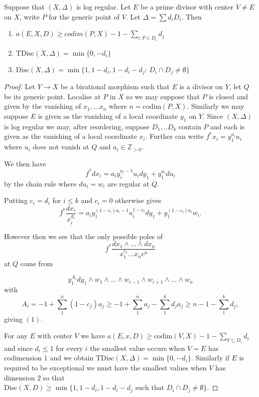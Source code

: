 \begin{lemma}
	Suppose that $(X,\Delta)$ is log regular. Let $E$ be a prime divisor with center $V\neq E$ on $X$, write $P$ for the generic point of $V$. Let $\Delta= \sum d_{i}D_{i}$.
	Then \begin{enumerate}
		\item $a(E,X,D)\geq codim(P,X) -1-\sum_{i: P\in D_{i}}d_{j}$
		\item $\text{TDisc}(X,\Delta)=\min\{0,-d_{i}\}$
		\item $\text{Disc}(X,\Delta) =\min\{1,1-d_{i},1-d_{i}-d_{j}\text{: } D_{i} \cap D_{j}\neq \emptyset\}$

	\end{enumerate}
\end{lemma}
\begin{proof}
	Let $Y \to X$ be a birational morphism such that $E$ is a divisor on $Y$, let $Q$ be its generic point. Localise at $P$ in $X$ so we may suppose that $P$ is closed and given by the vanishing of $x_{1},...x_{n}$ where $n=\text{codim}(P,X)$. Similarly we may suppose $E$ is given as the vanishing of a local coordinate $y_{1}$ on $Y$. Since $(X,\Delta)$ is log regular we may, after reordering, suppose $D_{1},..D_{k}$ contain $P$ and each is given as the vanishing of a local coordinate $x_{i}$. Further can write $f^{*}x_{i}=y_{1}^{a_{i}}u_{i}$ where $u_{i}$ does not vanish at $Q$ and $a_{i}\in \mathbb{Z}_{>0}$.
	
	We then have $$f^{*}dx_{i}=a_{i}y_{i}^{a_{i}-1}u_{i}dy_{1} + y_{1}^{a_{i}}du_{i}$$ by the chain rule where $du_{i}=w_{i}$ are regular at $Q$.
	
	Putting $c_{i}=d_{i}$ for $i \leq k$ and $c_{i}=0$ otherwise gives
	$$f^{*}\frac{dx_{i}}{x_{i}^{d_{i}}}=a_{i}y_{1}^{(1-c_{i})a_{i}-1}u_{i}^{1-c_{i}}dy_{1} +y_{1}^{(1-c_{i})a_{i}}w_{i}.$$
	
	However then we see that the only possible poles of 
	$$f^{*}\frac{dx_{1}\wedge...\wedge dx_{n}}{x_{1}^{c_{1}}...x_{n}c^{n}}$$
	at $Q$ come from 
	
	$$y_{1}^{A_{i}}dy_{1}\wedge w_{1}\wedge ... \wedge w_{i-1} \wedge w_{i+1} \wedge... \wedge w_{n}$$
	with $$A_{i}=-1+ \sum_{1}^{n} (1-c_{j})a_{j} \geq -1+\sum _{1}^{n}a_{j} -\sum_{1}^{k} d_{j}a_{j} \geq n -1 - \sum_{1}^{k} d_{j},$$ giving $(1)$.
	
	For any $E$ with center $V$ we have $a(E,x,D) \geq \text{codim}(V,X) -1 - \sum_{V \subseteq D_{i}} d_{i}$ and since $d_{i} \leq 1$ for every $i$ the smallest value occurs when $V=E$ has codimension $1$ and we obtain $\text{TDisc}(X,\Delta)=\min\{0,-d_{i}\}$. Similarly if $E$ is required to be exceptional we must have the smallest values when $V$ has dimension $2$ so that $\text{Disc}(X,D)\geq \min\{1,1-d_{i},1-d_{i}-d_{j} \text{ such that }D_{i}\cap D_{j} \neq \emptyset\}$.
	

\end{proof}
